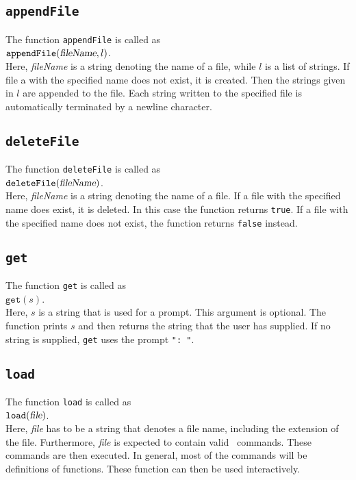 \subsection{\texttt{appendFile}}
The function \texttt{appendFile} is called as
\\[0.2cm]
\hspace*{1.3cm}
$\mathtt{appendFile}(\textsl{fileName}, l)$.
\\[0.2cm]
Here, \textsl{fileName} is a string denoting the name of a file, while $l$ is a list of
strings.  If file a with the specified name does not exist, it is created.  Then the strings
given in $l$ are appended to the file.   Each string written to the specified file is
automatically  terminated by a newline character.

\subsection{\texttt{deleteFile}}
The function \texttt{deleteFile} is called as
\\[0.2cm]
\hspace*{1.3cm}
$\mathtt{deleteFile}(\textsl{fileName})$.
\\[0.2cm]
Here, \textsl{fileName} is a string denoting the name of a file.
If a file with the specified name does exist, it is deleted.  In this case the function
returns \texttt{true}.  If a file with the specified name does not exist, the function
returns \texttt{false} instead.

\subsection{\texttt{get}}
The function \texttt{get}  is called as
\\[0.2cm]
\hspace*{1.3cm}
$\mathtt{get}(s)$.
\\[0.2cm]
Here, $s$ is a string that is used for a prompt. This argument is optional.  The function prints $s$ and then
returns the string that the user has supplied.  If no string is supplied, \texttt{get}
uses the prompt \texttt{": "}.

\subsection{\texttt{load}}
The function \texttt{load}  is called as
\\[0.2cm]
\hspace*{1.3cm}
$\mathtt{load}(\textsl{file})$.
\\[0.2cm]
Here, \textsl{file} has to be a string that denotes a file name, including  the extension
of the file.  Furthermore, \textsl{file} is expected to contain valid \setlx\ commands.
These commands are then executed.  In general, most of the commands will be definitions of
functions.  These function can then be used interactively.

